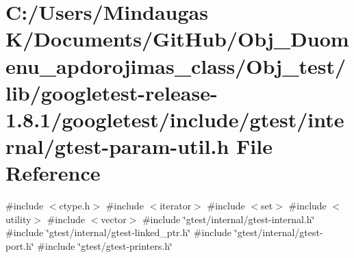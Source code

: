 \hypertarget{_obj__test_2lib_2googletest-release-1_88_81_2googletest_2include_2gtest_2internal_2gtest-param-util_8h}{}\section{C\+:/\+Users/\+Mindaugas K/\+Documents/\+Git\+Hub/\+Obj\+\_\+\+Duomenu\+\_\+apdorojimas\+\_\+class/\+Obj\+\_\+test/lib/googletest-\/release-\/1.8.1/googletest/include/gtest/internal/gtest-\/param-\/util.h File Reference}
\label{_obj__test_2lib_2googletest-release-1_88_81_2googletest_2include_2gtest_2internal_2gtest-param-util_8h}
{\ttfamily \#include $<$ctype.\+h$>$}\newline
{\ttfamily \#include $<$iterator$>$}\newline
{\ttfamily \#include $<$set$>$}\newline
{\ttfamily \#include $<$utility$>$}\newline
{\ttfamily \#include $<$vector$>$}\newline
{\ttfamily \#include \char`\"{}gtest/internal/gtest-\/internal.\+h\char`\"{}}\newline
{\ttfamily \#include \char`\"{}gtest/internal/gtest-\/linked\+\_\+ptr.\+h\char`\"{}}\newline
{\ttfamily \#include \char`\"{}gtest/internal/gtest-\/port.\+h\char`\"{}}\newline
{\ttfamily \#include \char`\"{}gtest/gtest-\/printers.\+h\char`\"{}}\newline
